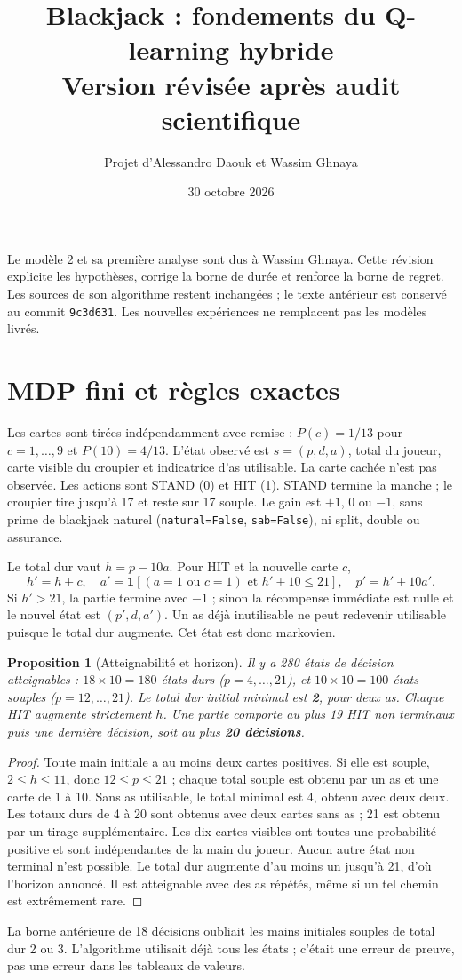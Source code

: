 \documentclass[11pt,a4paper]{article}
\title{Blackjack : fondements du Q-learning hybride\\\large Version révisée après audit scientifique}
\author{Projet d'Alessandro Daouk et Wassim Ghnaya}
\date{30 octobre 2026}
\newtheorem{proposition}{Proposition}
\theoremstyle{remark}\newtheorem*{remarque}{Remarque}
\newcommand{\1}{\mathbf 1}
\begin{document}
\maketitle
\noindent Le modèle 2 et sa première analyse sont dus à Wassim Ghnaya.
Cette révision explicite les hypothèses, corrige la borne de
durée et renforce la borne de regret. Les sources de son algorithme restent
inchangées ; le texte antérieur est conservé au commit
\texttt{9c3d631}. Les nouvelles expériences ne remplacent pas les modèles livrés.
\tableofcontents

\section{MDP fini et règles exactes}
Les cartes sont tirées indépendamment avec remise : $P(c)=1/13$ pour
$c=1,\ldots,9$ et $P(10)=4/13$. L'état observé est $s=(p,d,a)$, total du
joueur, carte visible du croupier et indicatrice d'as utilisable.
La carte cachée n'est pas observée. Les actions sont STAND (0) et HIT (1).
STAND termine la manche ; le croupier tire jusqu'à 17 et reste sur 17 souple.
Le gain est $+1$, 0 ou $-1$, sans prime de blackjack naturel
(\texttt{natural=False}, \texttt{sab=False}), ni split, double ou assurance.

Le total dur vaut $h=p-10a$. Pour HIT et la nouvelle carte $c$,
\[
 h'=h+c,\quad a'=\1[(a=1\text{ ou }c=1)\text{ et }h'+10\le21],\quad
 p'=h'+10a'.
\]
Si $h'>21$, la partie termine avec $-1$ ; sinon la récompense immédiate est
nulle et le nouvel état est $(p',d,a')$. Un as déjà inutilisable ne peut
redevenir utilisable puisque le total dur augmente. Cet état est donc markovien.

\begin{proposition}[Atteignabilité et horizon]
Il y a 280 états de décision atteignables : $18\times10=180$ états durs
($p=4,\ldots,21$), et $10\times10=100$ états souples ($p=12,\ldots,21$).
Le total dur initial minimal est \textbf{2}, pour deux as. Chaque HIT augmente
strictement $h$. Une partie comporte au plus 19 HIT non terminaux puis une
dernière décision, soit au plus \textbf{20 décisions}.
\end{proposition}
\begin{proof}
Toute main initiale a au moins deux cartes positives. Si elle est souple,
$2\le h\le11$, donc $12\le p\le21$ ; chaque total souple est obtenu par
un as et une carte de 1 à 10. Sans as utilisable, le total minimal est 4,
obtenu avec deux deux. Les totaux durs de 4 à 20 sont obtenus avec deux cartes
sans as ; 21 est obtenu par un tirage supplémentaire. Les dix cartes visibles
ont toutes une probabilité positive et sont indépendantes de la main du joueur.
Aucun autre état non terminal n'est possible. Le total dur augmente d'au moins
un jusqu'à 21, d'où l'horizon annoncé. Il est atteignable avec des as répétés,
même si un tel chemin est extrêmement rare.
\end{proof}
La borne antérieure de 18 décisions oubliait les mains initiales souples de
total dur 2 ou 3. L'algorithme utilisait déjà tous les états ; c'était une erreur
de preuve, pas une erreur dans les tableaux de valeurs.
\end{document}
